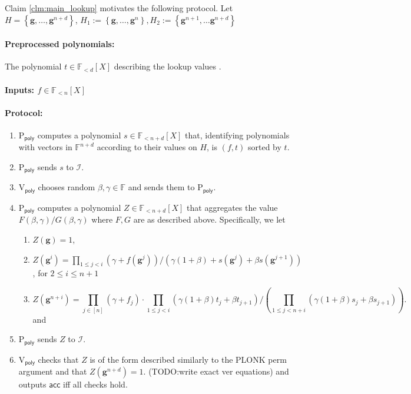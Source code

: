 \documentclass[11pt]{article} %
\newcommand{\F}{\ensuremath{\mathbb F}\xspace}
\newcommand{\acc}{\ensuremath{\mathsf{acc}}\xspace}
\newcommand{\defeq}{:=}
\newcommand{\prvpoly}{\ensuremath{\mathrm{P_{\mathsf{poly}}}}\xspace}
\newcommand{\verpoly}{\ensuremath{\mathrm{V_{\mathsf{poly}}}}\xspace}
\newcommand{\ideal}{\ensuremath{\mathcal{I}}\xspace}
\newcommand{\set}[1]{\ensuremath{\left\{#1\right\}}\xspace}
\newcommand{\hgen}{\ensuremath{\mathbf{g}}\xspace}
\newcommand{\polysofdeg}[1]{\ensuremath{\F_{< #1}[X]}\xspace}
\begin{document}
 Claim \ref{clm:main_lookup} motivates the following protocol.
 Let $H=\set{\hgen,\ldots,\hgen^{n+d}}$, $H_1\defeq \set{\hgen,\ldots,\hgen^n}, H_2 \defeq \set{\hgen^{n+1},\ldots\hgen^{n+d}}$
 \paragraph{Preprocessed polynomials:}
The polynomial $t \in \polysofdeg{d}$  describing the lookup values .


\paragraph{Inputs: $f\in \polysofdeg{n}$}
\paragraph{Protocol:}
\begin{enumerate}
 \item \prvpoly computes a polynomial $s\in \polysofdeg{n+d}$ that, identifying polynomials with vectors in $\F^{n+d}$ according to their values on $H$, is $(f,t)$ sorted by $t$.
 \item \prvpoly sends $s$ to \ideal.
 \item \verpoly chooses random $\beta,\gamma \in \F$ and sends them to \prvpoly.
 \item \prvpoly computes a polynomial $Z\in \polysofdeg{n+d}$ that aggregates the value $F(\beta,\gamma)/G(\beta,\gamma)$ where $F,G$ are as described above. Specifically, we let
\begin{enumerate}
 \item  $Z(\hgen) = 1$,
\item $Z(\hgen^i)=\prod_{1\leq j<i} (\gamma + f(\hgen^j))/(\gamma(1+\beta) + s(\hgen^j) + \beta s(\hgen^{j+1}))$, for $2\leq i \leq n+1$
\item \[Z(\hgen^{n+i})= \prod_{j\in [n]} (\gamma + f_j)\cdot \prod_{1\leq j < i} (\gamma(1+\beta) t_j + \beta t_{j+1})/\left(\prod_{1\leq j < n+i} (\gamma(1+\beta) s_j + \beta s_{j+1})\right).\]
 and
\end{enumerate}
 \item \prvpoly sends $Z$ to \ideal.
 \item \verpoly checks that $Z$ is of the form described similarly to the PLONK perm argument and
 that $Z(\hgen^{n+d})=1$.
 (TODO:write exact ver equations)
 and outputs \acc iff all checks hold.
\end{enumerate}
\end{document}
